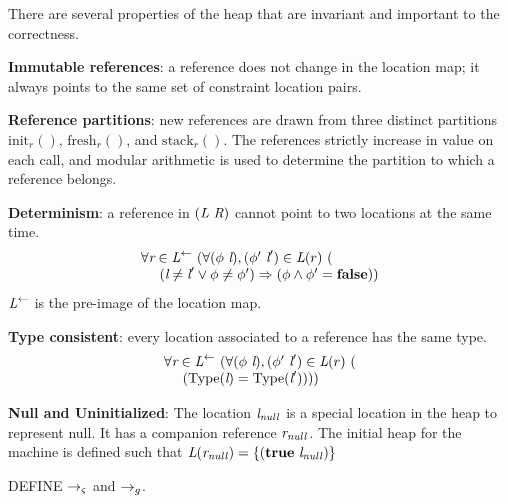 There are several properties of the heap that are invariant and
important to the correctness.
\begin{compactitem}
\item \textbf{Immutable references}: a reference does not change in
  the location map; it always points to the same set of constraint
  location pairs.
\item \textbf{Reference partitions}: new references are drawn from
  three distinct partitions $\mathrm{init}_r()$, $\mathrm{fresh}_r()$,
  and $\mathrm{stack}_r()$. The references strictly increase in value
  on each call, and modular arithmetic is used to determine the
  partition to which a reference belongs.
\item \textbf{Determinism}: a reference in  $(\emph{L}\ \emph{R})$ cannot point to two locations at the same time.
\[
\begin{array}{l}
\forall \cfgnt{r} \in \cfgnt{L}^\leftarrow\ (\forall (\phi\ \cfgnt{l}),(\phi^\prime\ \cfgnt{l}^\prime) \in \cfgnt{L}(r)\ (\\
\ \ \ \ (\cfgnt{l} \neq \cfgnt{l}^\prime \vee \phi \neq \phi^\prime) \Rightarrow (\phi \wedge \phi^\prime = \cfgt{false}))
\end{array}
\]
$\emph{L}^\leftarrow$ is the pre-image of the location map.
\item \textbf{Type consistent}: every location associated to a reference has the same type.
\[
\begin{array}{l}
\forall \cfgnt{r} \in \cfgnt{L}^\leftarrow\ (\forall (\phi\ \cfgnt{l}),(\phi^\prime\ \cfgnt{l}^\prime) \in \cfgnt{L}(r)\ (\\
\ \ \ \ (\mathrm{Type}\lp\cfgnt{l}\rp = \mathrm{Type}\lp\cfgnt{l}^\prime\rp)))
\end{array}
\]
\item \textbf{Null and Uninitialized}: The location $\emph{l}_\mathit{null}$ is a special location in the
heap to represent null. It has a companion reference
$\emph{r}_\mathit{null}$. The initial heap for the machine is defined
such that $\emph{L}(\emph{r}_\mathit{null}) =
\{(\textbf{true}\ \emph{l}_\mathit{null})\}$
\end{compactitem}

DEFINE $\rightarrow_{\varsigma}$ and $\rightarrow_{g}$.
